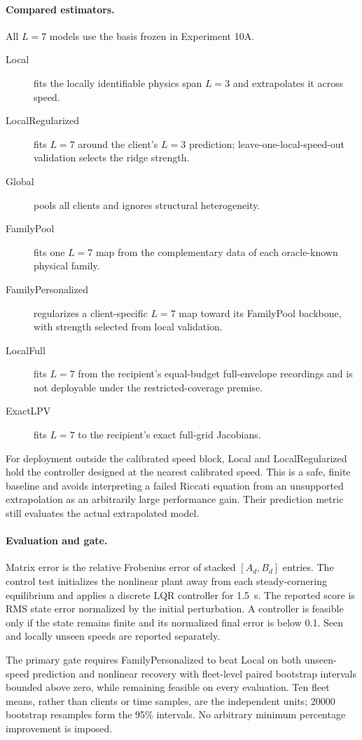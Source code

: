 \paragraph{Compared estimators.}
All $L=7$ models use the basis frozen in Experiment 10A.
\begin{description}
 \item[Local] fits the locally identifiable physics span $L=3$ and extrapolates
 it across speed.
 \item[LocalRegularized] fits $L=7$ around the client's $L=3$ prediction;
 leave-one-local-speed-out validation selects the ridge strength.
 \item[Global] pools all clients and ignores structural heterogeneity.
 \item[FamilyPool] fits one $L=7$ map from the complementary data of each
 oracle-known physical family.
 \item[FamilyPersonalized] regularizes a client-specific $L=7$ map toward its
 FamilyPool backbone, with strength selected from local validation.
 \item[LocalFull] fits $L=7$ from the recipient's equal-budget full-envelope
 recordings and is not deployable under the restricted-coverage premise.
 \item[ExactLPV] fits $L=7$ to the recipient's exact full-grid Jacobians.
\end{description}

For deployment outside the calibrated speed block, Local and LocalRegularized
hold the controller designed at the nearest calibrated speed. This is a safe,
finite baseline and avoids interpreting a failed Riccati equation from an
unsupported extrapolation as an arbitrarily large performance gain. Their
prediction metric still evaluates the actual extrapolated model.

\paragraph{Evaluation and gate.}
Matrix error is the relative Frobenius error of stacked $[A_d,B_d]$ entries.
The control test initializes the nonlinear plant away from each steady-cornering
equilibrium and applies a discrete LQR controller for 1.5~s. The reported score
is RMS state error normalized by the initial perturbation. A controller is
feasible only if the state remains finite and its normalized final error is
below 0.1. Seen and locally unseen speeds are reported separately.

The primary gate requires FamilyPersonalized to beat Local on both unseen-speed
prediction and nonlinear recovery with fleet-level paired bootstrap intervals
bounded above zero, while remaining feasible on every evaluation. Ten fleet
means, rather than clients or time samples, are the independent units; 20000
bootstrap resamples form the 95\% intervals. No arbitrary minimum percentage
improvement is imposed.


